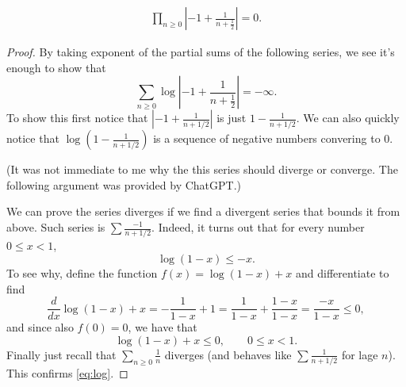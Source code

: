 \begin{claim}\leavevmode
\begin{align*}
			\prod_{n\geq 0}\left|  -1+\frac{1}{n+\frac{1}{2}}\right|=0.
				\end{align*}
\end{claim}			
\begin{proof}\leavevmode
By taking exponent of the partial sums of the following series, we see it's enough to show that
\begin{equation}\label{eq:log}\sum_{n \geq 0}\operatorname{log}\left|  -1+\frac{1}{n+\frac{1}{2}}\right|=-\infty.
\end{equation}
To show this first notice that $\left|  -1+\frac{1}{n+1/2}\right|$ is just  $1-\frac{1}{n+1/2}$. We can also quickly notice that $\operatorname{log}\left(1-\frac{1}{n+1/2}\right)$ is a sequence of negative numbers convering to 0.

(It was not immediate to me why the this series should diverge or converge. The following argument was provided by ChatGPT.)

We can prove the series diverges if we find a divergent series that bounds it from above. Such series is $\sum\frac{-1}{n+1/2}$. Indeed, it turns out that for every number $0\leq x<1$,
\[\operatorname{log}(1-x) \leq -x.\]
To see why, define the function $f(x)=\operatorname{log}(1-x)+x$ and differentiate to find
\[\frac{d}{dx}\operatorname{log}(1-x)+x=-\frac{1}{1-x}+1=\frac{1}{1-x}+\frac{1-x}{1-x}=\frac{-x}{1-x}\leq 0,\]
and since also $f(0)=0$, we have that
\[\operatorname{log}(1-x)+x\leq 0,\qquad 0\leq x<1.\]
Finally just recall that $\sum_{n\geq 0}\frac{1}{n}$ diverges (and behaves like $\sum \frac{1}{n+1/2}$ for lage $n$). This confirms \cref{eq:log}.




\end{proof}

\printbibliography





